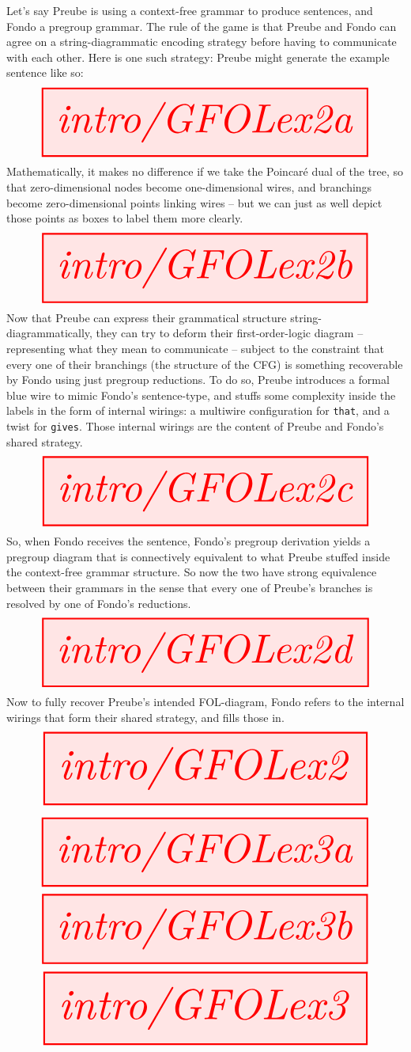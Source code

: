 \begin{fullwidth}
\begin{example}
Let's say Preube is using a context-free grammar to produce sentences, and Fondo a pregroup grammar. The rule of the game is that Preube and Fondo can agree on a string-diagrammatic encoding strategy before having to communicate with each other. Here is one such strategy: Preube might generate the example sentence like so:
\[\resizebox{\textwidth}{!}{\tikzfig{intro/GFOLex2a}}\]
Mathematically, it makes no difference if we take the Poincar\'{e} dual of the tree, so that zero-dimensional nodes become one-dimensional wires, and branchings become zero-dimensional points linking wires -- but we can just as well depict those points as boxes to label them more clearly.
\[\resizebox{\textwidth}{!}{\tikzfig{intro/GFOLex2b}}\]
Now that Preube can express their grammatical structure string-diagrammatically, they can try to deform their first-order-logic diagram -- representing what they mean to communicate -- subject to the constraint that every one of their branchings (the structure of the CFG) is something recoverable by Fondo using just pregroup reductions. To do so, Preube introduces a formal blue wire to mimic Fondo's sentence-type, and stuffs some complexity inside the labels in the form of internal wirings: a multiwire configuration for \texttt{that}, and a twist for \texttt{gives}. Those internal wirings are the content of Preube and Fondo's shared strategy.
\[\resizebox{\textwidth}{!}{\tikzfig{intro/GFOLex2c}}\]
So, when Fondo receives the sentence, Fondo's pregroup derivation yields a pregroup diagram that is connectively equivalent to what Preube stuffed inside the context-free grammar structure. So now the two have strong equivalence between their grammars in the sense that every one of Preube's branches is resolved by one of Fondo's reductions.
\[\resizebox{\textwidth}{!}{\tikzfig{intro/GFOLex2d}}\]
Now to fully recover Preube's intended FOL-diagram, Fondo refers to the internal wirings that form their shared strategy, and fills those in.
\[\resizebox{\textwidth}{!}{\tikzfig{intro/GFOLex2}}\]
\end{example}

\begin{example}
\[\resizebox{\textwidth}{!}{\tikzfig{intro/GFOLex3a}}\]
\[\resizebox{\textwidth}{!}{\tikzfig{intro/GFOLex3b}}\]
\[\resizebox{\textwidth}{!}{\tikzfig{intro/GFOLex3}}\]
\end{example}


\end{fullwidth}
